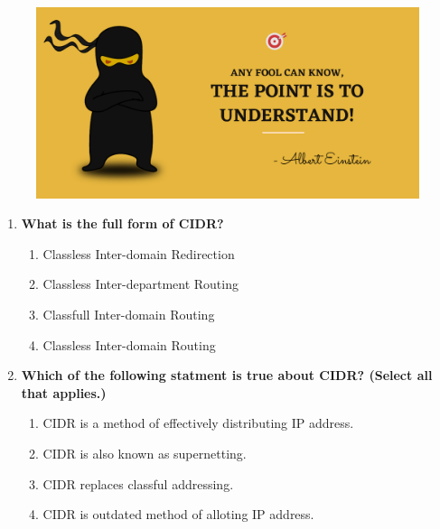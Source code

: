 \setlength{\columnsep}{3pt}
\begin{flushleft}
	
	\paragraph{}
	\bigskip
	
	\begin{figure}[h!]
		\centering
		\includegraphics[scale=.2]{content/practise.jpg}
	\end{figure}	
	\begin{enumerate}
		
		\item \textbf{What is the full form of CIDR?}
		\begin{enumerate}[label=(\alph*)]
			\item Classless Inter-domain Redirection 
			\item Classless Inter-department Routing
			\item Classfull Inter-domain Routing
			\item Classless Inter-domain Routing  %
		\end{enumerate}
		\bigskip
		\bigskip
		
		\item \textbf{Which of the following statment is true about CIDR? (Select all that applies.)}
		\begin{enumerate}[label=(\alph*)]
			\item CIDR is a method of effectively distributing IP address.  %
			\item CIDR is also known as supernetting.  %
			\item CIDR replaces classful addressing.  %
			\item CIDR is outdated method of alloting IP address.
		\end{enumerate}
		\bigskip
		\bigskip	
				
	\end{enumerate}
\end{flushleft}

\newpage

